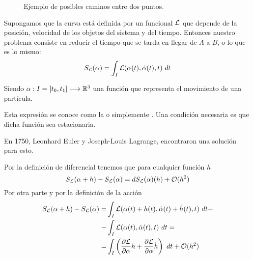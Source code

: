 \begin{figure}[H]
	\centering
	\caption{Ejemplo de posibles caminos entre dos puntos.}\label{pic:braquistocrona}
\end{figure}

Supongamos que la curva está definida por un funcional $\mathcal{L}$ que depende de la posición, velocidad de los objetos del sistema y del tiempo. Entonces nuestro problema consiste en reducir el tiempo que se tarda en llegar de $A$ a $B$, o lo que es lo mismo:
\begin{equation}
	\label{eq:accion}
	S_{\mathcal{L}}(\alpha) = \int_{I}\mathcal{L}(\alpha(t), \dot{\alpha}(t), t)\ dt
\end{equation}

Siendo $\alpha:I=[t_0, t_1]\longrightarrow \mathbb{R}^3$ una función que representa el movimiento de una partícula.

Esta expresión se conoce como la  o simplemente . Una condición necesaria es que dicha función sea estacionaria.

En 1750, Leonhard Euler y Joseph-Louis Lagrange, encontraron una solución para esto.

Por la definición de diferencial tenemos que para cualquier función $h$
\begin{equation*}
	S_{\mathcal{L}}(\alpha + h) -  S_{\mathcal{L}}(\alpha) = dS_{\mathcal{L}}(\alpha)(h) +\mathcal{O}(h^2)
\end{equation*}
Por otra parte y por la definición de la acción
\begin{equation*}
	\begin{split}
		S_{\mathcal{L}}(\alpha + h) -  S_{\mathcal{L}}(\alpha) = & \int_{I}\mathcal{L}(\alpha(t)+h(t), \dot{\alpha}(t)+\dot{h}(t), t)\ dt - \\
		- & \int_{I}\mathcal{L}(\alpha(t), \dot{\alpha}(t), t)\ dt =\\
		=& \int_{I}\left( \frac{\partial \mathcal{L}}{\partial\alpha}h+\frac{\partial \mathcal{L}}{\partial\dot{\alpha}}\dot{h}\right)\ dt+\mathcal{O}(h^2)
	\end{split}
\end{equation*}

